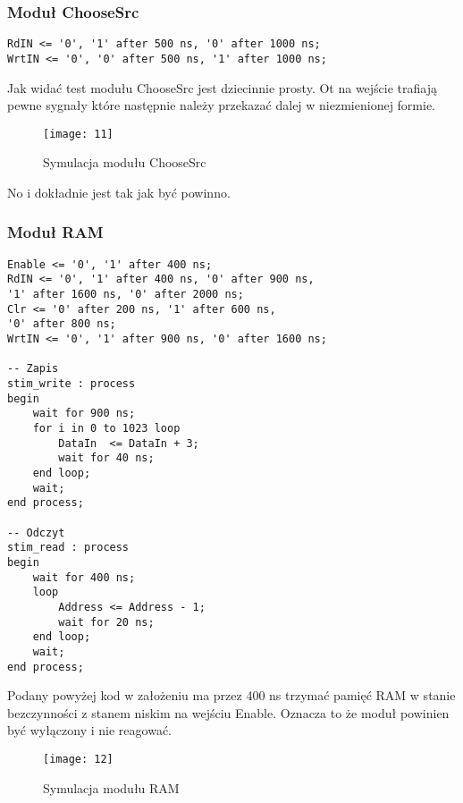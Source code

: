 \documentclass[11pt]{article}
\begin{document}
	\subsubsection{Moduł ChooseSrc}
	
	\begin{lstlisting}[frame=single, caption={Test modułu ChooseSrc},captionpos=b]
RdIN <= '0', '1' after 500 ns, '0' after 1000 ns;
WrtIN <= '0', '0' after 500 ns, '1' after 1000 ns;
	\end{lstlisting}
	
	Jak widać test modułu ChooseSrc jest dziecinnie prosty. Ot na wejście trafiają pewne sygnały które następnie należy przekazać dalej w niezmienionej formie.
	
	\begin{figure}[h]
		\centering
		\centerline{\texttt{[image: 11]}}
		\caption{Symulacja modułu ChooseSrc}
		\label{fig:11}
	\end{figure}
	
	
	No i dokładnie jest tak jak być powinno.
	
	\newpage
	
	\subsubsection{Moduł RAM}
	
	\begin{lstlisting}[frame=single, caption={Test modułu RAM},captionpos=b]
Enable <= '0', '1' after 400 ns;
RdIN <= '0', '1' after 400 ns, '0' after 900 ns,
'1' after 1600 ns, '0' after 2000 ns;
Clr <= '0' after 200 ns, '1' after 600 ns,
'0' after 800 ns;
WrtIN <= '0', '1' after 900 ns, '0' after 1600 ns;
	
-- Zapis
stim_write : process
begin		
	wait for 900 ns;	
	for i in 0 to 1023 loop
		DataIn  <= DataIn + 3;
		wait for 40 ns;
	end loop;
	wait;
end process;
	
-- Odczyt
stim_read : process
begin		
	wait for 400 ns;	
	loop
		Address <= Address - 1;
		wait for 20 ns;
	end loop;
	wait;
end process;
	\end{lstlisting}
	Podany powyżej kod w założeniu ma przez 400 ns trzymać pamięć RAM w stanie bezczynności z stanem niskim na wejściu Enable. Oznacza to że moduł powinien być wyłączony i nie reagować.
	
	\begin{figure}[H]
		\centering
		\centerline{\texttt{[image: 12]}}
		\caption{Symulacja modułu RAM}
		\label{fig:11}
	\end{figure}
	
\end{document}
